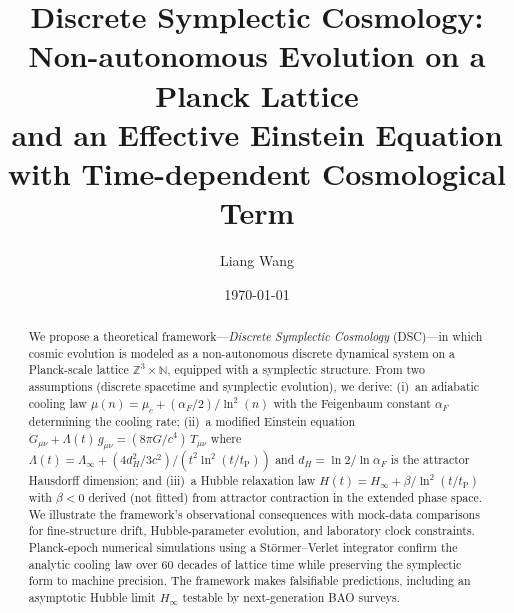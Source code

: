\documentclass[twocolumn,showpacs,preprintnumbers,amsmath,amssymb,prd]{revtex4-2}
\newcommand{\lnq}{\ln^2}
\newcommand{\tP}{t_{\mathrm{P}}}
\newcommand{\Hinf}{H_{\infty}}
\newcommand{\ZZ}{\mathbb{Z}}
\newcommand{\NN}{\mathbb{N}}
\begin{document}
\title{Discrete Symplectic Cosmology: Non-autonomous Evolution on a Planck Lattice\\
and an Effective Einstein Equation with Time-dependent Cosmological Term}

\author{Liang Wang}

\date{\today}

\begin{abstract}
We propose a theoretical framework---\textit{Discrete Symplectic
Cosmology} (DSC)---in which cosmic evolution is modeled as a
non-autonomous discrete dynamical system on a Planck-scale lattice
$\ZZ^3 \times \NN$, equipped with a symplectic structure.
From two assumptions (discrete spacetime and symplectic evolution),
we derive: (i)~an adiabatic cooling law
$\mu(n) = \mu_c + (\alpha_F/2)/\lnq(n)$ with the Feigenbaum constant
$\alpha_F$ determining the cooling rate;
(ii)~a modified Einstein equation
$G_{\mu\nu} + \Lambda(t)\,g_{\mu\nu} = (8\pi G/c^4)\,T_{\mu\nu}$
where $\Lambda(t) = \Lambda_\infty + (4d_H^2/3c^2)/(t^2\lnq(t/\tP))$
and $d_H = \ln 2/\ln\alpha_F$ is the attractor Hausdorff dimension;
and (iii)~a Hubble relaxation law
$H(t) = \Hinf + \beta/\lnq(t/\tP)$ with $\beta < 0$ derived
(not fitted) from attractor contraction in the extended phase space.
We illustrate the framework's observational consequences with
mock-data comparisons for fine-structure drift,
Hubble-parameter evolution, and laboratory clock constraints.
Planck-epoch numerical simulations using a St\"ormer--Verlet
integrator confirm the analytic cooling law over 60 decades of
lattice time while preserving the symplectic form to machine precision.
The framework makes falsifiable predictions, including an asymptotic
Hubble limit $\Hinf$ testable by next-generation BAO surveys.
\end{abstract}


\maketitle

\end{document}
